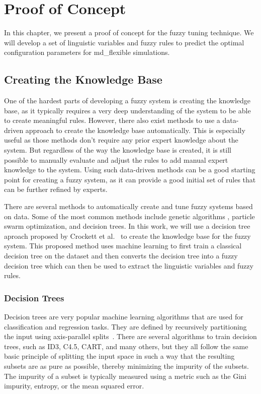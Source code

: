 \chapter{Proof of Concept}
\label{sec:proof_of_concept}

In this chapter, we present a proof of concept for the fuzzy tuning technique. We will develop a set of linguistic variables and fuzzy rules to predict the optimal configuration parameters for md\_flexible simulations.

\section{Creating the Knowledge Base}

One of the hardest parts of developing a fuzzy system is creating the knowledge base, as it typically requires a very deep understanding of the system to be able to create meaningful rules. However, there also exist methods to use a data-driven approach to create the knowledge base automatically. This is especially useful as those methods don't require any prior expert knowledge about the system. But regardless of the way the knowledge base is created, it is still possible to manually evaluate and adjust the rules to add manual expert knowledge to the system. Using such data-driven methods can be a good starting point for creating a fuzzy system, as it can provide a good initial set of rules that can be further refined by experts.

There are several methods to automatically create and tune fuzzy systems based on data. Some of the most common methods include genetic algorithms , particle swarm optimization, and decision trees.
In this work, we will use a decision tree aproach proposed by Crockett et al.~\cite{CROCKETT20062809} to create the knowledge base for the fuzzy system. This proposed method uses machine learning to first train a classical decision tree on the dataset and then converts the decision tree into a fuzzy decision tree which can then be used to extract the linguistic variables and fuzzy rules.


\subsection{Decision Trees}

Decision trees are very popular machine learning algorithms that are used for classification and regression tasks. They are defined by recursively partitioning the input using axis-parallel splits~\cite{10.5555/2380985}. There are several algorithms to train decision trees, such as ID3, C4.5, CART, and many others, but they all follow the same basic principle of splitting the input space in such a way that the resulting subsets are as pure as possible, thereby minimizing the impurity of the subsets. The impurity of a subset is typically measured using a metric such as the Gini impurity, entropy, or the mean squared error. 

